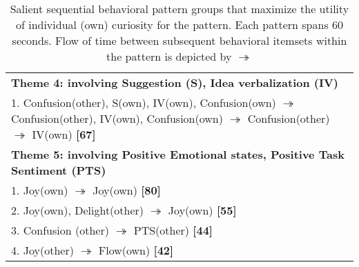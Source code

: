\documentclass{llncs}
\begin{document}
\begin{table*} [hp]
{\begin{tabular}{|p{12.5cm}|}
{\bf {\scriptsize Theme 4: involving Suggestion (S), Idea verbalization (IV)}}  \\ 
1. Confusion(other), S(own), IV(own), Confusion(own) {\Large $\twoheadrightarrow$}  Confusion(other), IV(own), Confusion(own) {\Large $\twoheadrightarrow$} Confusion(other) {\Large $\twoheadrightarrow$} IV(own) \textbf{[67]}\\

\hline 


{\bf {\scriptsize Theme 5: involving Positive Emotional states, Positive Task Sentiment (PTS)}}  \\ 
1. Joy(own) {\Large $\twoheadrightarrow$} Joy(own) \textbf{[80]}\\
2. Joy(own), Delight(other) {\Large $\twoheadrightarrow$} Joy(own) \textbf{[55]}\\
3.  Confusion (other)  {\Large $\twoheadrightarrow$} PTS(other) \textbf{[44]}\\
4. Joy(other) {\Large $\twoheadrightarrow$} Flow(own) \textbf{[42]}\\

\hline

\end{tabular}}
\caption{Salient sequential behavioral pattern groups that maximize the utility of individual (own) curiosity for the pattern. Each pattern spans 60 seconds. Flow of time between subsequent behavioral itemsets within the pattern is depicted by {\Large $\twoheadrightarrow$}}\label{tab:1}
\end{table*}
\vspace{-1cm}
\end{document}
